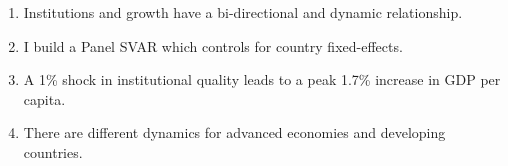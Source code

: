\documentclass{article}
\begin{document}
\begin{enumerate}
\item Institutions and growth have a bi-directional and dynamic relationship.
    
\item I build a Panel SVAR which controls for country fixed-effects.
    
\item A 1\% shock in institutional quality leads to a peak 1.7\% increase in GDP per capita.
    
\item There are different dynamics for advanced economies and developing countries.
    
\end{enumerate}
\end{document}
